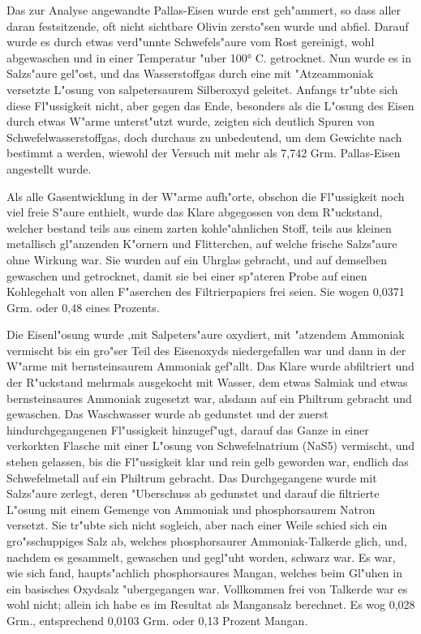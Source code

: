 \documentclass[a4paper, 11pt, oneside]{article}
\begin{document}
Das zur Analyse angewandte Pallas-Eisen wurde erst geh"ammert, so dass aller daran festsitzende, oft nicht sichtbare Olivin zersto"sen wurde und abfiel. Darauf wurde es durch etwas verd"unnte Schwefels"aure vom Rost gereinigt, wohl abgewaschen und in einer Temperatur "uber 100° C. getrocknet. Nun wurde es in Salzs"aure gel"ost, und das Wasserstoffgas durch eine mit "Atzeammoniak versetzte L"osung von salpetersaurem Silberoxyd geleitet. Anfangs tr"ubte sich diese Fl"ussigkeit nicht, aber gegen das Ende, besonders als die L"osung des Eisen durch etwas W"arme unterst"utzt wurde, zeigten sich deutlich Spuren von Schwefelwasserstoffgas, doch durchaus zu unbedeutend, um dem Gewichte nach bestimmt a werden, wiewohl der Versuch mit mehr als 7,742 Grm. Pallas-Eisen angestellt wurde.

Als alle Gasentwicklung in der W"arme aufh"orte, obschon die Fl"ussigkeit noch viel freie S"aure enthielt, wurde das Klare abgegossen von dem R"uckstand, welcher bestand teils aus einem zarten kohle"ahnlichen Stoff, teils aus kleinen metallisch gl"anzenden K"ornern und Flitterchen, auf welche frische Salzs"aure ohne Wirkung war. Sie wurden auf ein Uhrglas gebracht, und auf demselben gewaschen und getrocknet, damit sie bei einer sp"ateren Probe auf einen Kohlegehalt von allen F"aserchen des Filtrierpapiers frei seien. Sie wogen 0,0371 Grm. oder 0,48 eines Prozents.

Die Eisenl"osung wurde ‚mit Salpeters"aure oxydiert, mit "atzendem Ammoniak vermischt bis ein gro"ser Teil des Eisenoxyds niedergefallen war und dann in der W"arme mit bernsteinsaurem Ammoniak gef"allt. Das Klare wurde abfiltriert und der R"uckstand mehrmals ausgekocht mit Wasser, dem etwas Salmiak und etwas bernsteinsaures Ammoniak zugesetzt war, alsdann auf ein Philtrum gebracht und gewaschen. Das Waschwasser wurde ab gedunstet und der zuerst hindurchgegangenen Fl"ussigkeit hinzugef"ugt, darauf das Ganze in einer verkorkten Flasche mit einer L"osung von Schwefelnatrium (NaS5) vermischt, und stehen gelassen, bis die Fl"ussigkeit klar und rein gelb geworden war, endlich das Schwefelmetall auf ein Philtrum gebracht. Das Durchgegangene wurde mit Salzs"aure zerlegt, deren "Uberschuss ab gedunstet und darauf die filtrierte L"osung mit einem Gemenge von Ammoniak und phosphorsaurem Natron versetzt. Sie tr"ubte sich nicht sogleich, aber nach einer Weile schied sich ein gro"sschuppiges Salz ab, welches phosphorsaurer Ammoniak-Talkerde glich, und, nachdem es gesammelt, gewaschen und gegl"uht worden, schwarz war. Es war, wie sich fand, haupts"achlich phosphorsaures Mangan, welches beim Gl"uhen in ein basisches Oxydsalz "ubergegangen war. Vollkommen frei von Talkerde war es wohl nicht; allein ich habe es im Resultat als Mangansalz berechnet. Es wog 0,028 Grm., entsprechend 0,0103 Grm. oder 0,13 Prozent Mangan.
\end{document}
